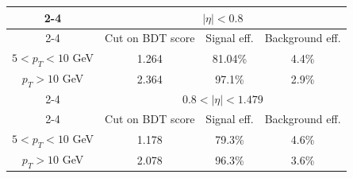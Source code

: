 \begin{table}[h!]
\scriptsize
    \centering
    \begin{tabular}{|c|c c c}
\cline{2-4}
  \multicolumn{1}{ c|}{}             & \multicolumn{3}{|c|}{$|\eta| < 0.8 $}                        \\                      
\cline{2-4} %
   \multicolumn{1}{c|}{}            & Cut on BDT score & Signal eff. & \multicolumn{1}{c|}{Background eff.}  \\ 
\hline %
$ 5 < p_T < 10 $ GeV              & 1.264                        & 81.04\%            &  \multicolumn{1}{c|}{4.4\%}  \\                   
\hline %
 $p_T > 10$ GeV                     &  2.364		& 97.1\%		&  \multicolumn{1}{c|}{2.9\%}		\\
\hline %
\cline{2-4}
  \multicolumn{1}{ c|}{}             & \multicolumn{3}{|c|}{$0.8 < |\eta| < 1.479$}                        \\            
\cline{2-4} %
   \multicolumn{1}{c|}{}            & Cut on BDT score & Signal eff.      & \multicolumn{1}{c|}{Background eff.}  \\
\hline  %
$ 5 < p_T < 10 $ GeV              & 1.178                     & 79.3\%           &  \multicolumn{1}{c|}{4.6\%}     \\
\hline %
$p_T > 10$ GeV                      &  2.078		         & 96.3\%	  &  \multicolumn{1}{c|}{3.6\%}		\\
\hline %


\end{tabular}
\end{table}
